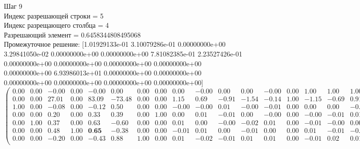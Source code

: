\documentclass[draft]{article}
\begin{document}
\begin{flushleft}
    Шаг 9 \\
    Индекс разрешающей строки = 5\\
    Индекс разрещающего столбца = 4\\
    Разрешающий элемент = 0.6458344808495068\\
    Промежуточное решение:
    [1.01929133e-01  3.10079286e-01  0.00000000e+00  3.29841050e-02
    0.00000000e+00  0.00000000e+00  7.81082385e-01  2.23527426e-01
    0.00000000e+00  0.00000000e+00  0.00000000e+00  0.00000000e+00
    0.00000000e+00  6.93986013e+01  0.00000000e+00  0.00000000e+00
    0.00000000e+00  0.00000000e+00  0.00000000e+00  0.00000000e+00]
\begin{equation*}
\begin{pmatrix}
    0.00 & 0.00 & -0.00 & 0.00 & -0.00 &   0.00 & 0.00 & 0.00 &  0.00 & -0.00 &  0.00 &  0.00 & -0.00 & 0.00 &  1.00 &  1.00 &  1.00 &  1.00 &  1.00 &  1.00 & -0.00 \\
    0.00 & 0.00 & 27.01 & 0.00 & 83.09 & -73.48 & 0.00 & 0.00 &  1.15 &  0.69 & -0.91 & -1.54 & -0.14 & 1.00 & -1.15 & -0.69 &  0.91 &  1.54 &  0.14 & -1.00 & 69.40 \\
    1.00 & 0.00 & -0.08 & 0.00 & -0.12 &   0.50 & 0.00 & 0.00 & -0.00 & -0.00 &  0.01 & -0.00 & -0.01 & 0.00 &  0.00 &  0.00 & -0.01 &  0.00 &  0.01 &  0.00 &  0.10 \\
    0.00 & 0.00 &  0.20 & 0.00 &  0.33 &   0.39 & 0.00 & 1.00 &  0.00 &  0.01 & -0.01 &  0.00 & -0.00 & 0.00 & -0.00 & -0.01 &  0.01 & -0.00 &  0.00 &  0.00 &  0.22 \\
    0.00 & 1.00 &  0.37 & 0.00 &  0.63 &  -0.60 & 0.00 & 0.00 &  0.01 &  0.00 & -0.00 & -0.02 &  0.01 & 0.00 & -0.01 & -0.00 &  0.00 &  0.02 & -0.01 &  0.00 &  0.31 \\
    0.00 & 0.00 &  0.48 & 1.00 &  \textbf{0.65} &  -0.38 & 0.00 & 0.00 & -0.01 &  0.01 &  0.00 & -0.01 &  0.00 & 0.00 &  0.01 & -0.01 & -0.00 &  0.01 & -0.00 &  0.00 &  0.03 \\
    0.00 & 0.00 & -0.20 & 0.00 & -0.43 &   0.88 & 1.00 & 0.00 &  0.01 & -0.02 & -0.01 &  0.01 &  0.01 & 0.00 & -0.01 &  0.02 &  0.01 & -0.01 & -0.01 &  0.00 &  0.78 \\
\end{pmatrix}
\end{equation*}
\end{flushleft}
\end{document}
